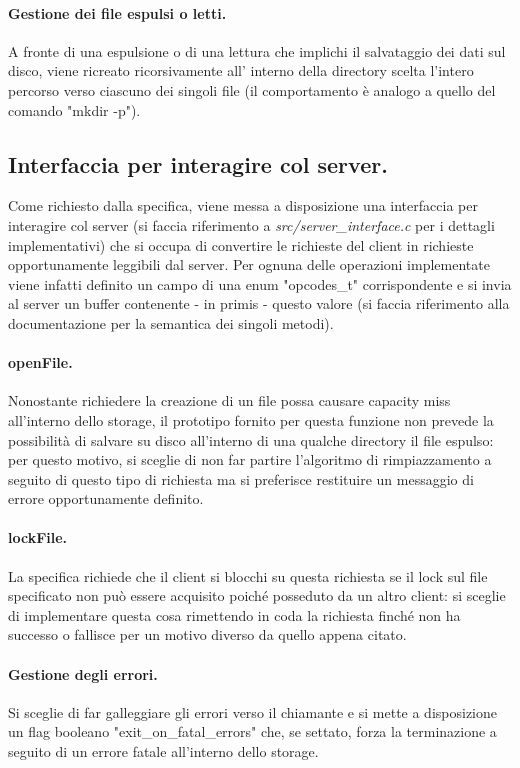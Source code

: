\documentclass[11pt, italian, openany]{book}
\begin{document}
\begin{sloppypar}
\paragraph*{Gestione dei file espulsi o letti.}
A fronte di una espulsione o di una lettura che implichi il salvataggio dei dati sul disco, viene ricreato ricorsivamente all'
interno della directory scelta l'intero percorso verso ciascuno dei singoli file (il comportamento \`e analogo a quello del comando
"mkdir -p").

\subsection{Interfaccia per interagire col server.}
Come richiesto dalla specifica, viene messa a disposizione una interfaccia per interagire col server (si faccia rife\-ri\-mento a 
\textit{src/server\_interface.c} per i dettagli implementativi) che si occupa di convertire le richieste del client in
richieste opportunamente leggibili dal server. Per ognuna delle operazioni implementate viene infatti definito un campo di una enum
"opcodes\_t" corrispondente e si invia al server un buffer contenente - in primis - questo valore (si faccia riferimento alla
documentazione per la semantica dei singoli metodi).

\paragraph*{openFile.}
Nonostante richiedere la creazione di un file possa causare capacity miss all'interno dello storage, il prototipo fornito
per questa funzione non prevede la possibilit\`a di salvare su disco all'interno di una qualche directory il file espulso:
per questo motivo, si sceglie di non far partire l'algoritmo di rimpiazzamento a seguito di questo tipo di richiesta ma si
preferisce restituire un messaggio di errore opportunamente definito.

\paragraph*{lockFile.}
La specifica richiede che il client si blocchi su questa richiesta se il lock sul file specificato non pu\`o essere acquisito
poich\'e posseduto da un altro client: si sceglie di implementare questa cosa rimettendo in coda la richiesta finch\'e non ha
successo o fallisce per un motivo diverso da quello appena citato.

\paragraph*{Gestione degli errori.}
Si sceglie di far galleggiare gli errori verso il chiamante e si mette a disposizione un flag booleano "exit\_on\_fatal\_errors"
che, se settato, forza la terminazione a seguito di un errore fatale all'interno dello storage.


\end{sloppypar}
\end{document}

